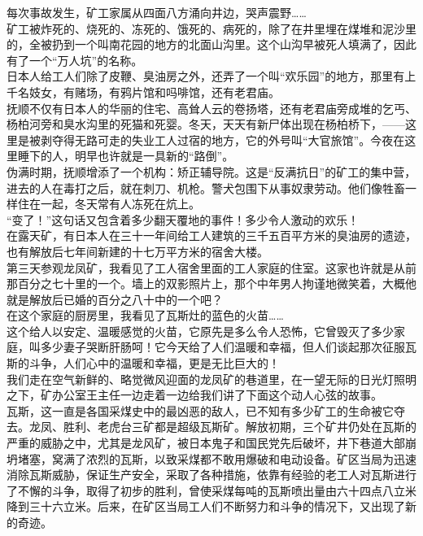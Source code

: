 每次事故发生，矿工家属从四面八方涌向井边，哭声震野……\\

矿工被炸死的、烧死的、冻死的、饿死的、病死的，除了在井里埋在煤堆和泥沙里的，全被扔到一个叫南花园的地方的北面山沟里。这个山沟早被死人填满了，因此有了一个“万人坑”的名称。\\

日本人给工人们除了皮鞭、臭油房之外，还弄了一个叫“欢乐园”的地方，那里有上千名妓女，有赌场，有鸦片馆和吗啡馆，还有老君庙。\\

抚顺不仅有日本人的华丽的住宅、高耸人云的卷扬塔，还有老君庙旁成堆的乞丐、杨柏河旁和臭水沟里的死猫和死婴。冬天，天天有新尸体出现在杨柏桥下，——这里是被剥夺得无路可走的失业工人过宿的地方，它的外号叫“大官旅馆”。今夜在这里睡下的人，明早也许就是一具新的“路倒”。\\

伪满时期，抚顺增添了一个机构：矫正辅导院。这是“反满抗日”的矿工的集中营，进去的人在毒打之后，就在刺刀、机枪。警犬包围下从事奴隶劳动。他们像牲畜一样住在一起，冬天常有人冻死在炕上。\\

“变了！”这句话又包含着多少翻天覆地的事件！多少令人激动的欢乐！\\

在露天矿，有日本人在三十一年间给工人建筑的三千五百平方米的臭油房的遗迹，也有解放后七年间新建的十七万平方米的宿舍大楼。\\

第三天参观龙凤矿，我看见了工人宿舍里面的工人家庭的住室。这家也许就是从前那百分之七十里的一个。墙上的双影照片上，那个中年男人拘谨地微笑着，大概他就是解放后已婚的百分之八十中的一个吧？\\

在这个家庭的厨房里，我看见了瓦斯灶的蓝色的火苗……\\

这个给人以安定、温暖感觉的火苗，它原先是多么令人恐怖，它曾毁灭了多少家庭，叫多少妻子哭断肝肠呵！它今天给了人们温暖和幸福，但人们谈起那次征服瓦斯的斗争，人们心中的温暖和幸福，更是无比巨大的！\\

我们走在空气新鲜的、略觉微风迎面的龙凤矿的巷道里，在一望无际的日光灯照明之下，矿办公室王主任一边走着一边给我们讲了下面这个动人心弦的故事。\\

瓦斯，这一直是各国采煤史中的最凶恶的敌人，已不知有多少矿工的生命被它夺去。龙凤、胜利、老虎台三矿都是超级瓦斯矿。解放初期，三个矿井仍处在瓦斯的严重的威胁之中，尤其是龙风矿，被日本鬼子和国民党先后破坏，井下巷道大部崩坍堵塞，窝满了浓烈的瓦斯，以致采煤都不敢用爆破和电动设备。矿区当局为迅速消除瓦斯威胁，保证生产安全，采取了各种措施，依靠有经验的老工人对瓦斯进行了不懈的斗争，取得了初步的胜利，曾使采煤每吨的瓦斯喷出量由六十四点八立米降到三十六立米。后来，在矿区当局工人们不断努力和斗争的情况下，又出现了新的奇迹。\\

